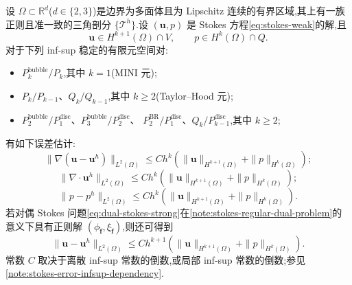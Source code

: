 \begin{corollary}\label{cor:stokes-conforming-infsup-estimates}
设 $\Omega\subset\mathbb{R}^d$($d\in\{2,3\}$)是边界为多面体且为 Lipschitz 连续的有界区域,其上有一族正则且准一致的三角剖分 $\{\mathcal{T}^h\}$.设 $(\bm{u},p)$ 是 Stokes 方程\cref{eq:stokes-weak}的解,且
\[
  \bm{u}\in H^{k+1}(\Omega)\cap V,
  \qquad p\in H^k(\Omega)\cap Q.
\]
对于下列 inf-sup 稳定的有限元空间对:
\begin{itemize}
  \item $P_k^{\mathrm{bubble}}/P_k$,其中 $k=1$(MINI 元);
  \item $P_k/P_{k-1}$、$Q_k/Q_{k-1}$,其中 $k\ge2$(Taylor--Hood 元);
  \item $P_2^{\mathrm{bubble}}/P_1^{\mathrm{disc}}$、$P_3^{\mathrm{bubble}}/P_2^{\mathrm{disc}}$、
        $P_2^{\mathrm{BR}}/P_1^{\mathrm{disc}}$、$Q_k/P_{k-1}^{\mathrm{disc}}$,其中 $k\ge2$;
\end{itemize}
有如下误差估计:
\begin{equation}\label{eq:stokes-fem-convergence-h1}
  \|\nabla(\bm{u}-\bm{u}^h)\|_{L^2(\Omega)}
  \leq Ch^k\left(
    \|\bm{u}\|_{H^{k+1}(\Omega)}
    +\|p\|_{H^k(\Omega)}
  \right);
\end{equation}
\begin{equation}\label{eq:stokes-fem-convergence-divergence}
  \|\nabla\cdot\bm{u}^h\|_{L^2(\Omega)}
  \leq Ch^k\left(
    \|\bm{u}\|_{H^{k+1}(\Omega)}
    +\|p\|_{H^k(\Omega)}
  \right);
\end{equation}
\begin{equation}\label{eq:stokes-fem-convergence-pressure}
  \|p-p^h\|_{L^2(\Omega)}
  \leq Ch^k\left(
    \|\bm{u}\|_{H^{k+1}(\Omega)}
    +\|p\|_{H^k(\Omega)}
  \right).
\end{equation}
若对偶 Stokes 问题\cref{eq:dual-stokes-strong}在\cref{note:stokes-regular-dual-problem}的意义下具有正则解 $(\phi_{\widehat{\bm{f}}},\xi_{\widehat{\bm{f}}})$,则还可得到
\begin{equation}\label{eq:stokes-fem-convergence-velocity-l2}
  \|\bm{u}-\bm{u}^h\|_{L^2(\Omega)}
  \leq Ch^{k+1}\left(
    \|\bm{u}\|_{H^{k+1}(\Omega)}
    +\|p\|_{H^k(\Omega)}
  \right).
\end{equation}
常数 $C$ 取决于离散 inf-sup 常数的倒数,或局部 inf-sup 常数的倒数;参见\cref{note:stokes-error-infsup-dependency}.
\end{corollary}

